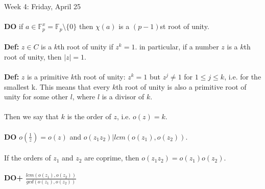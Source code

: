 \documentclass[12pt]{article}
\theoremstyle{remark}
\newcommand{\F}{\mathbb{F}}
\begin{document}
\begin{section}{Week 4: Friday, April 25}
\\\\\textbf{DO} if $a \in \F_p^x = \F_p\setminus\{0\}$ then $\chi(a)$ is a $(p-1)$st root of unity.
\\\\\textbf{Def:} $z \in C$ is a $k$th root of unity if $z^k = 1$. in particular, if a number $z$ is a $k$th root of unity, then $|z| = 1$.
\\\\\textbf{Def:} $z$ is a primitive $k$th root of unity: $z^k =1$ but $z^j \neq 1$ for $1 \leq j \leq k$, i.e. for the smallest k. This means that every $k$th root of unity is also a primitive root of unity for some other $l$, where $l$ is a divisor of $k$.
\\\\Then we say that $k$ is the order of $z$, i.e. $o(z) = k$.
\\\\\textbf{DO} $o(\frac 1 z) = o(z)$ and $o(z_1z_2) | lcm(o(z_1),o(z_2))$.
\\\\If the orders of $z_1$ and $z_2$ are coprime, then $o(z_1z_2) = o(z_1)o(z_2)$.
\\\\\textbf{DO+} $\frac{lcm(o(z_1),o(z_2))}{gcd (o(z_1),o(z_2))}$

\end{section}
\newpage
\end{document}
